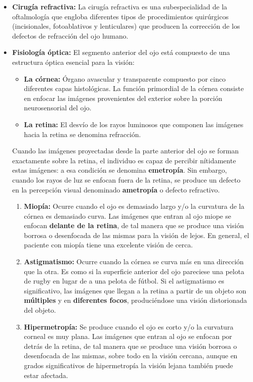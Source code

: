 \begin{itemize}
    \item \textbf{Cirugía refractiva: }La cirugía refractiva es una subespecialidad de la oftalmología que engloba diferentes tipos de procedimientos quirúrgicos (incisionales, fotoablativos y lenticulares) que producen la corrección de los defectos de refracción del ojo humano.

    \item \textbf{Fisiología óptica: }El segmento anterior del ojo está compuesto de una estructura óptica esencial para la visión:
    \begin{itemize}
        \item \textbf{La córnea: }Órgano avascular y transparente compuesto por cinco diferentes capas histológicas. La función primordial de la córnea  consiste en enfocar las imágenes provenientes del exterior sobre la porción neurosensorial del ojo.
        \item \textbf{La retina: }El desvío de los rayos luminosos que componen las imágenes hacia la retina se denomina refracción.
    \end{itemize}
    Cuando las imágenes proyectadas desde la parte anterior del ojo se forman exactamente sobre la retina, el individuo es capaz de percibir nítidamente estas imágenes: a esa condición se denomina \textbf{emetropía}. Sin embargo, cuando los rayos de luz se enfocan fuera de la retina, se produce un defecto en la percepción visual denominado \textbf{ametropía} o defecto refractivo.
    \begin{enumerate}
        \item \textbf{Miopía: }Ocurre cuando el ojo es demasiado largo y/o la curvatura de la córnea es demasiado curva. Las imágenes que entran al ojo miope se enfocan \textbf{delante de la retina}, de tal manera que se produce una visión borrosa o desenfocada de las mismas para la visión de lejos. En general, el paciente con miopía tiene una excelente visión de cerca.
        \item \textbf{Astigmatismo: }Ocurre cuando la córnea se curva más en una dirección que la otra. Es como si la superficie anterior del ojo pareciese una pelota de rugby en lugar de a una pelota de fútbol. Si el astigmatismo es significativo, las imágenes que llegan a la retina a partir de un objeto son \textbf{múltiples} y en \textbf{diferentes focos}, produciéndose una visión distorionada del objeto.
        \item \textbf{Hipermetropía: }Se produce cuando el ojo es corto y/o la curvatura corneal es muy plana. Las imágenes que entran al ojo se enfocan por detrás de la retina, de tal manera que se produce una visión borrosa o desenfocada de las mismas, sobre todo en la visión cercana, aunque en grados significativos de hipermetropía la visión lejana también puede estar afectada.

\end{enumerate}
\end{itemize}
